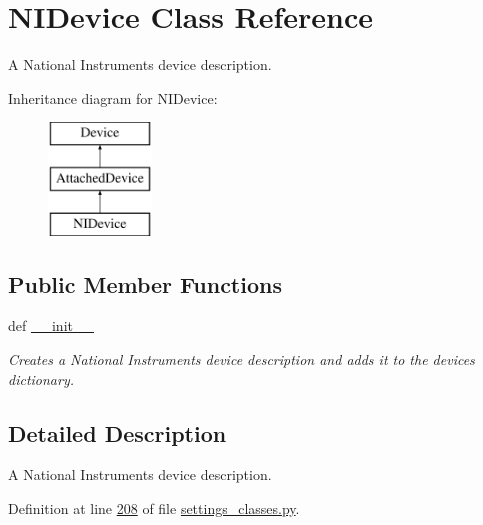 \hypertarget{classsettings__classes_1_1_n_i_device}{\section{\-N\-I\-Device \-Class \-Reference}
\label{classsettings__classes_1_1_n_i_device}
}


\-A \-National \-Instruments device description.  


\-Inheritance diagram for \-N\-I\-Device\-:\begin{figure}[H]
\begin{center}
\leavevmode
\includegraphics[height=3.000000cm]{classsettings__classes_1_1_n_i_device}
\end{center}
\end{figure}
\subsection*{\-Public \-Member \-Functions}
\begin{DoxyCompactItemize}
\item 
def \hyperlink{classsettings__classes_1_1_n_i_device_ac775ee34451fdfa742b318538164070e}{\-\_\-\-\_\-init\-\_\-\-\_\-}
\begin{DoxyCompactList}\small\item\em \-Creates a \-National \-Instruments device description and adds it to the devices dictionary. \end{DoxyCompactList}\end{DoxyCompactItemize}


\subsection{\-Detailed \-Description}
\-A \-National \-Instruments device description. 

\-Definition at line \hyperlink{settings__classes_8py_source_l00208}{208} of file \hyperlink{settings__classes_8py_source}{settings\-\_\-classes.\-py}.



